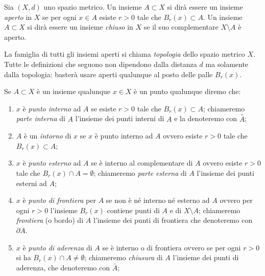 \begin{definition}%
\mymark{*}%
\label{def:466342}%
Sia $(X,d)$ uno spazio metrico.
Un insieme $A\subset X$ si dirà essere un insieme
\emph{aperto}%
%
 in $X$ se per ogni $x\in A$ esiste $r>0$
tale che $B_r(x) \subset A$.
Un insieme $A\subset X$ si dirà essere un insieme 
\emph{chiuso}%
%
 in $X$ se il suo complementare $X\setminus A$ è aperto.

La famiglia di tutti gli insiemi aperti si chiama \emph{topologia}%
%
 dello spazio metrico $X$. 
Tutte le definizioni che seguono non dipendono dalla distanza $d$ ma solamente dalla topologia: 
basterà usare aperti qualunque al posto delle palle $B_r(x)$.

Se $A\subset X$ è un insieme qualunque
$x\in X$ è un punto qualunque diremo che:
\begin{enumerate}
\item
$x$ è \emph{punto interno}%
%
 ad $A$ se esiste $r>0$ tale che $B_r(x) \subset A$;
chiameremo
\emph{parte interna}%
%
di $A$ l'insieme dei punti interni di $A$
e la denoteremo con $\stackrel\circ A$;
\item
$A$ è un \emph{intorno}%
%
 di $x$ se $x$ è punto interno ad $A$
ovvero esiste $r>0$ tale che $B_r(x)\subset A$;
\item
$x$ è \emph{punto esterno}%
%
 ad $A$ se è interno al complementare di $A$ ovvero esiste $r>0$ tale che $B_r(x) \cap A = \emptyset$;
chiameremo \emph{parte esterna}%
%
 di $A$ l'insieme dei punti esterni ad $A$;
\item
$x$ è \emph{punto di frontiera}%
%
 per $A$ se non è né interno né esterno ad $A$ ovvero per ogni $r>0$ l'insieme $B_r(x)$ contiene punti di $A$ e di $X\setminus A$;
chiameremo \emph{frontiera}%
%
 (o bordo) di $A$ l'insieme dei punti di frontiera che denoteremo con $\partial A$.
\item
$x$ è \emph{punto di aderenza}%
%
 di $A$ se è interno o di frontiera ovvero se per ogni $r>0$ si ha $B_r(x) \cap A \neq \emptyset$;
chiameremo \emph{chiusura} di $A$ l'insieme dei punti di aderenza,
che denoteremo con $\bar A$;

\end{enumerate}
\end{definition}
